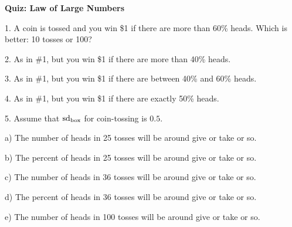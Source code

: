 \documentclass[10pt]{article}
\begin{document}
\begin{center}
\textbf{\large Quiz: Law of Large Numbers}
\end{center}


1. A coin is tossed and you win \$1 if there are more than 60\% heads.  Which 
is better:  10 tosses or 100?
\medskip

2. As in \#1, but you win \$1 if there are more than 40\% heads.  
\medskip

3. As in \#1, but you win \$1 if there are between  40\% and 60\% heads.  
\medskip

4. As in \#1, but you win \$1 if there are exactly 50\% heads.  
\medskip

5.  Assume that $\mbox{sd}_{\mbox{\scriptsize box}}$ for coin-tossing is $0.5$.

\hspace{10pt} a) The number of heads in 25 tosses will be around 
   \underline{\hspace{1in}} give or take 
   \underline{\hspace{1in}} or so.
\vspace{.5in}

\hspace{10pt} b) The percent of heads in 25 tosses will be around 
   \underline{\hspace{1in}} give or take 
   \underline{\hspace{1in}} or so.
\vspace{.5in}

\hspace{10pt} c) The number of heads in 36 tosses will be around 
   \underline{\hspace{1in}} give or take 
   \underline{\hspace{1in}} or so.
\vspace{.5in}

\hspace{10pt} d) The percent of heads in 36 tosses will be around 
   \underline{\hspace{1in}} give or take 
   \underline{\hspace{1in}} or so.
\vspace{.5in}

\hspace{10pt} e) The number of heads in 100 tosses will be around 
   \underline{\hspace{1in}} give or take 
   \underline{\hspace{1in}} or so.
\vspace{.5in}
\end{document}
